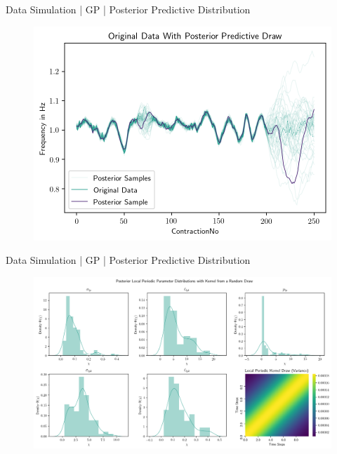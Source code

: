 \documentclass{beamer}
\begin{document}
    \begin{frame}{Data Simulation | GP | Posterior Predictive Distribution}
        \begin{figure}[hbt]
        	\center
        	\includegraphics[width=1.0\textwidth]{img/gp_data_example_posterior_predictive.png}
        	\label{fig:posterior_predictive_kernel}
        \end{figure}
    \end{frame}

     \begin{frame}{Data Simulation | GP | Posterior Predictive Distribution}
        \begin{figure}[hbt]
        	\center
        	\includegraphics[width=1.0\textwidth]{img/gp_kernel_posterior_local_periodic_zoomed.png}
        	\label{fig:posterior_predictive_kernel}
        \end{figure}
    \end{frame}
    
\end{document}

